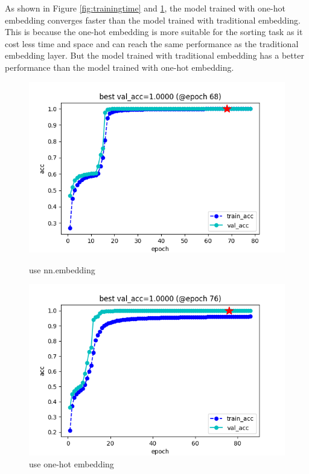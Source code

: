 \documentclass{article}
\begin{document}
As shown in Figure \ref{fig:trainingtime} and \ref{fig:onehot}, the model trained with one-hot embedding converges faster than the model trained with traditional embedding. This is because the one-hot embedding is more suitable for the sorting task as it cost less time and space and can reach the same performance as the traditional embedding layer. But the model trained with traditional embedding has a better performance than the model trained with one-hot embedding.
\begin{figure}[ht]
    \centering
    \begin{minipage}{0.45\textwidth}
        \centering
        \includegraphics[width=\textwidth]{picture/training_base.png}
        \caption{use nn.embedding}
        \label{fig:trainingtime}
    \end{minipage}\hfill
    \begin{minipage}{0.45\textwidth}
        \centering
        \includegraphics[width=\textwidth]{picture/training_onehot.png}
        \caption{use one-hot embedding}
        \label{fig:onehot}
    \end{minipage}
\end{figure}
\end{document}
